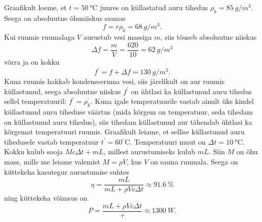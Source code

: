 \solu
Graafikult loeme, et $t=\SI{50}{\degreeCelsius}$ juures on küllastatud auru tihedus $\rho_{k}=\SI{85}{g/m^3}$. Seega on absoluutne õhuniiskus saunas
$$
f=r \rho_{k}=\SI{68}{g/m^3}.
$$
Kui ruumis ruumalaga $V$ aurustub vesi massiga $m$, siis tõuseb absoluutne niiskus
$$
\Delta f=\frac{m}{V}=\frac{620}{10}=\SI{62}{g/m^3}
$$
võrra ja on kokku
$$
f^{\prime}=f+\Delta f=\SI{130}{g/m^3}.
$$
Kuna ruumis hakkab kondenseeruma vesi, siis järelikult on aur ruumis küllastunud, seega absoluutne niiskus $f^{\prime}$ on ühtlasi ka küllastunud auru tihedus sellel temperatuuril:
$f^{\prime}=\rho_{k}^{\prime} .$ Kuna igale temperatuurile vastab ainult üks kindel küllastunud auru tiheduse väärtus (mida kõrgem on temperatuur, seda tihedam on küllastunud auru tihedus), siis tihedam küllastunud aur tähendab ühtlasi ka kõrgemat temperatuuri ruumis. Graafikult leiame, et sellise küllastunud auru tihedusele vastab temperatuur $t^{\prime}=60^{\circ} \mathrm{C}$. Temperatuuri muut on $\Delta t=\SI{10}{\degreeCelsius}$. Kokku kulub sooja $M c \Delta t+m L$, millest aurustumiseks kulub $m L$. Siin $M$ on õhu mass, mille me leiame valemist $M=\rho V$, kus $V$ on sauna ruumala. Seega on küttekeha kasutegur aurustumise suhtes
$$
\eta=\frac{m L}{m L+\rho V c \Delta t} \approx \SI{91,6}{\%}
$$
ning küttekeha võimsus on
$$
P=\frac{m L+\rho V c \Delta t}{\tau} \approx \SI{1300}{W}.
$$

\probend